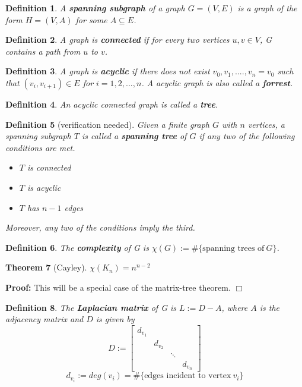 \documentclass[11pt]{article}
\newtheorem{theorem}{Theorem}
\newtheorem{definition}[theorem]{Definition}
\newenvironment{proof}{\noindent \textbf{Proof:}}{$\Box$}
\begin{document}
\begin{definition}
A \textbf{spanning subgraph} of a graph $G=(V,E)$ is a graph of the form $H=(V,A)$ for some $A\subseteq E$.
\end{definition}

\begin{definition}
A graph is \textbf{connected} if for every two vertices $u,v\in V$, G contains a path from $u$ to $v$.
\end{definition}

\begin{definition}
A graph is \textbf{acyclic} if there does not exist $v_0,v_1,....,v_n=v_0$ such that $(v_i,v_{i+1})\in E$ for $i=1,2,...,n$. A acyclic graph is also called a \textbf{forrest}.
\end{definition}

\begin{definition}
An acyclic connected graph is called a \textbf{tree}.
\end{definition}

\begin{definition}[verification needed]
Given a finite graph $G$ with $n$ vertices, a spanning subgraph $T$ is called a \textbf{spanning tree} of $G$ if any two of the following conditions are met.
\begin{itemize}
\item $T$ is connected
\item $T$ is acyclic
\item $T$ has $n-1$ edges
\end{itemize}
Moreover, any two of the conditions imply the third.
\end{definition}

\begin{definition}
The \textbf{complexity} of G is $\chi (G) := \#\{\text{spanning trees of}~ G\}$.
\end{definition}

\begin{theorem}[Cayley]
$\chi(K_n)=n^{n-2}$
\end{theorem}

\begin{proof}
This will be a special case of the matrix-tree theorem.
\end{proof}

\begin{definition}
The \textbf{Laplacian matrix} of G is $L:=D-A$, where $A$ is the adjacency matrix and $D$ is given by
$$D:={
\begin{bmatrix}
d_{v_1}\\
~&d_{v_2}\\
~&~&\ddots\\
~&~&~&d_{v_n}
\end{bmatrix}}$$
$$d_{v_i}:=deg(v_i)=\#\{\text{edges incident to vertex} ~v_i\}$$
\end{definition}
\end{document}
